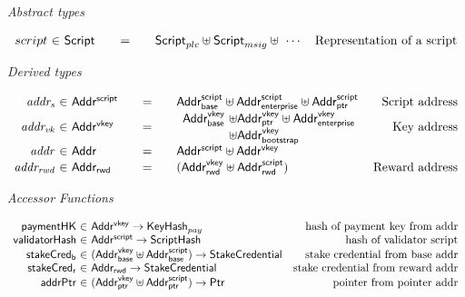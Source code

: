 \documentclass[11pt,a4paper,dvipsnames,twosided]{article}
\newcommand{\Addr}{\type{Addr}}
\newcommand{\AddrVKey}{\type{Addr^{vkey}}}
\newcommand{\StakeObject}{\type{StakeCredential}}
\newcommand{\AddrRWD}{\type{Addr_{rwd}}}
\newcommand{\AddrRWDVKey}{\type{Addr_{rwd}^{vkey}}}
\newcommand{\AddrRWDScr}{\type{Addr_{rwd}^{script}}}
\newcommand{\AddrVKeyB}{\type{Addr^{vkey}_{base}}}
\newcommand{\AddrVKeyP}{\type{Addr^{vkey}_{ptr}}}
\newcommand{\AddrVKeyE}{\type{Addr^{vkey}_{enterprise}}}
\newcommand{\AddrVKeyBS}{\type{Addr^{vkey}_{bootstrap}}}
\newcommand{\AddrScr}{\type{Addr^{script}}}
\newcommand{\AddrScrBase}{\type{Addr_{base}^{script}}}
\newcommand{\AddrScrEnterprise}{\type{Addr_{enterprise}^{script}}}
\newcommand{\AddrScrPtr}{\type{Addr_{ptr}^{script}}}
\newcommand{\HashScr}{\type{ScriptHash}}
\newcommand{\Ptr}{\type{Ptr}}
\newcommand{\Script}{\type{Script}}
\newcommand{\ScriptPlutus}{\Script_{plc}}
\newcommand{\ScriptMSig}{\Script_{msig}}
\newcommand{\KeyHash}{\type{KeyHash}}
\theoremstyle{definition}
\begin{document}
\begin{figure*}[hbt]
  \emph{Abstract types}

  \begin{equation*}
    \begin{array}{r@{~\in~}l@{\qquad=\qquad}lr}
      script & \Script & \ScriptPlutus\uniondistinct\ScriptMSig\uniondistinct\,\,\cdots  & \text{Representation of a script}
    \end{array}
  \end{equation*}

  \emph{Derived types}

  \begin{equation*}
    \begin{array}{r@{~\in~}l@{\qquad=\qquad}lr}
      \var{addr_{s}} & \AddrScr & \AddrScrBase \uniondistinct \AddrScrEnterprise
                              \uniondistinct \AddrScrPtr & \text{Script address} \\
      \var{addr_{vk}} & \AddrVKey & \begin{array}{l@{~\uniondistinct}l}
                             \AddrVKeyB & \AddrVKeyP \uniondistinct \AddrVKeyE \\
                                    & \AddrVKeyBS
                           \end{array}
                                & \text{Key address}\\
      \var{addr} & \Addr & \AddrScr \uniondistinct \AddrVKey \\
      \var{addr_{rwd}} & \AddrRWD & (\AddrRWDVKey \uniondistinct \AddrRWDScr)
                                                         & \text{Reward address}
    \end{array}
  \end{equation*}

  \emph{Accessor Functions}

  \begin{equation*}
    \begin{array}{r@{~\in~}lr}
      \fun{paymentHK} & \AddrVKey \to \KeyHash_{pay}
      & \text{hash of payment key from addr}\\
      \fun{validatorHash} & \AddrScr \to \HashScr & \text{hash of validator
                                                    script} \\
      \fun{stakeCred_{b}} & (\AddrVKeyB \uniondistinct \AddrScrBase) \to
                          \StakeObject & \text{stake credential from base
                                      addr}\\
      \fun{stakeCred_{r}} & \AddrRWD \to \StakeObject & \text{stake credential
                                                   from reward addr}\\
      \fun{addrPtr} & (\AddrVKeyP \uniondistinct \AddrScrPtr) \to \Ptr &
                                                                         \text{pointer
                                                                         from
                                                                         pointer addr}
    \end{array}
  \end{equation*}


\end{figure*}
\end{document}
